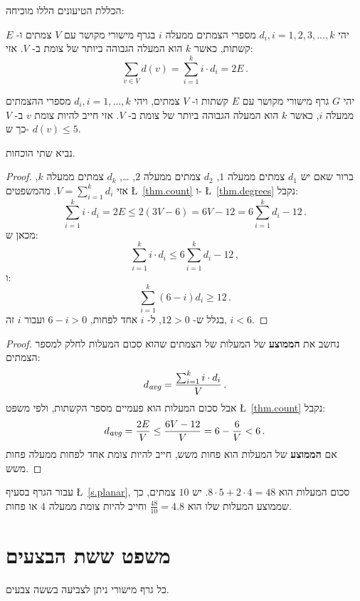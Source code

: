 הכללת הטיעונים הללו מוכיחה:
\begin{theorem}\label{thm.degrees}
יהי
$d_i, i=1,2,3,\ldots,k$
מספרי הצמתים ממעלה
$i$
בגרף מישורי מקושר עם
$V$
צמתים ו-%
$E$ 
קשתות, כאשר
$k$
הוא המעלה הגבוהה ביותר של צומת ב-%
$V$.
אזי:
\[
\sum_{v\in V} d(v) =\sum_{i=1}^{k} i\cdot d_i=2E\,.
\]
\end{theorem}
\vspace*{-6ex}
\begin{theorem}\label{thm.degree5}
יהי
$G$
גרף מישורי מקושר עם
$E$
קשתות ו-%
$V$
צמתים, ויהי
$d_i,i=1,\ldots,k$
מספרי ההצמתים ממעלה
$i$,
כאשר
$k$
הוא המעלה הגבוהה ביותר של צומת ב-%
$V$.
אזי חייב להיות צומת
$v$
ב-%
$V$
כך ש-%
$d(v) \leq 5$.
\end{theorem}

נביא שתי הוכחות.

\begin{proof}
ברור שאם יש 
$d_1$
צמתים ממעלה
$1$, $d_2$ 
צמתים ממעלה
$2$, \ldots, $d_k$
צמתים ממעלה
$k$, 
אזי
$V=\sum_{i=1}^{k}d_i$. 
מהמשפטים
\L{~\ref{thm.count}}
ו-%
\L{~\ref{thm.degrees}}
נקבל:
\[
\sum_{i=1}^{k} i\cdot d_i=2E\leq 2(3V-6) = 6V-12=6\sum_{i=1}^{k} d_i -12\,.
\]
מכאן ש:
\[
\sum_{i=1}^{k} i\cdot d_i \leq 6\sum_{i=1}^{k} d_i -12\,,
\]
ו:
\[
\sum_{i=1}^{k} (6-i)d_i\geq 12\,.
\]
בגלל ש-%
$12>0$,
ל-%
$i$
אחד לפחות,
$6-i>0$
ועבור 
$i$
זה,
$i<6$. 
\end{proof}

\begin{proof}
נחשב את 
\textbf{הממוצע}
של המעלות של הצמתים שהוא סכום המעלות לחלק למספר הצמתים:
\[
d_{\textit{\footnotesize avg}}=\frac{\sum_{i=1}^{k} i\cdot d_i}{V}\,.
\]
אבל סכום המעלות הוא פעמיים מספר הקשתות, ולפי משפט
\L{~\ref{thm.count}}
נקבל:
\[
d_{\textit{\footnotesize avg}}=\frac{2E}{V}\leq \frac{6V-12}{V}=6-\frac{6}{V}<6\,.
\]
אם 
\textbf{הממוצע}
של המעלות הוא פחות משש, חייב להיות צומת אחד לפחות ממעלה פחות משש.
\end{proof}


עבור הגרף בסעיף
\L{~\ref{s.planar}},
סכום המעלות הוא
$8\cdot 5 + 2\cdot 4=48$.
יש 
$10$
צמתים, כך שממוצע המעלות שלו הוא
$\frac{48}{10}=4.8$
וחייב להיות צומת ממעלה 
$4$
או פחות.




\section{משפט ששת הבצעים}\label{s.six-color}

\begin{theorem}\label{thm.sixcolor}
כל גרף מישורי ניתן לצביעה בששה צבעים.
\end{theorem}

